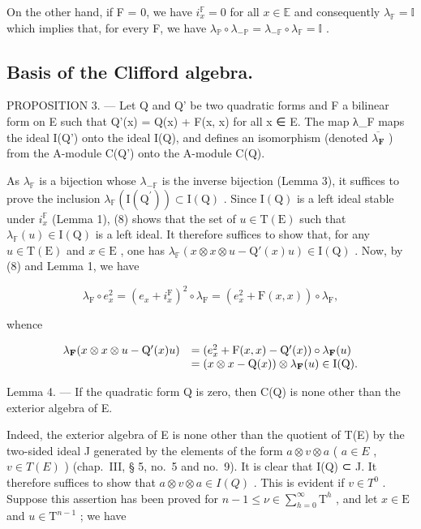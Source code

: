 On the other hand, if F = 0, we have \(i_x^{\mathbb{F}} = 0\) for all \(x \in \mathbb{E}\) and consequently \(\lambda_{\mathbb{F}} = \mathbb{I}\) which implies that, for every F, we have \(\lambda_{\mathbb{P}} \circ \lambda_{-\mathbb{P}} = \lambda_{-\mathbb{F}} \circ \lambda_{\mathbb{F}} = \mathbb{I}\) .

\subsection{Basis of the Clifford algebra.}

PROPOSITION 3. --- Let Q and Q' be two quadratic forms and F a bilinear form on E such that Q'(x) = Q(x) + F(x, x) for all x ∈ E. The map λ\_F maps the ideal I(Q') onto the ideal I(Q), and defines an isomorphism (denoted \(\overline{\lambda_{\mathbf{F}}}\) ) from the A-module C(Q') onto the A-module C(Q).

As \(\lambda_{\mathbb{F}}\) is a bijection whose \(\lambda_{-\mathbb{F}}\) is the inverse bijection (Lemma 3), it suffices to prove the inclusion \(\lambda_{\mathbb{F}}(\mathrm{I}(\mathrm{Q}^{\prime})) \subset \mathrm{I}(\mathrm{Q})\) . Since \(\mathrm{I}(\mathrm{Q})\) is a left ideal stable under \(i_x^{\mathbb{F}}\) (Lemma 1), (8) shows that the set of \(u \in \mathrm{T}(\mathrm{E})\) such that \(\lambda_{\mathbb{F}}(u) \in \mathrm{I}(\mathrm{Q})\) is a left ideal. It therefore suffices to show that, for any \(u \in \mathrm{T}(\mathrm{E})\) and \(x \in \mathrm{E}\) , one has \(\lambda_{\mathbb{F}}(x \otimes x \otimes u - \mathrm{Q}'(x)u) \in \mathrm{I}(\mathrm{Q})\) . Now, by (8) and Lemma 1, we have

\[
\lambda_ {\mathrm{F}} \circ e _ {x} ^ {2} = (e _ {x} + i _ {x} ^ {\mathrm{F}}) ^ {2} \circ \lambda_ {\mathrm{F}} = (e _ {x} ^ {2} + \mathrm{F} (x, x)) \circ \lambda_ {\mathrm{F}},
\]

whence

\[
\begin{array}{r l} \lambda_ {\mathbf {F}} (x \otimes x \otimes u - \mathrm{Q} ^ {\prime} (x) u) & = (e _ {x} ^ {2} + \mathrm{F} (x, x) - \mathrm{Q} ^ {\prime} (x)) \circ \lambda_ {\mathbf {F}} (u) \\ & = (x \otimes x - \mathrm{Q} (x)) \otimes \lambda_ {\mathbf {F}} (u) \in \mathrm{I} (\mathrm{Q}). \end{array}
\]

Lemma 4. — If the quadratic form Q is zero, then C(Q) is none other than the exterior algebra of E.

Indeed, the exterior algebra of E is none other than the quotient of T(E) by the two-sided ideal J generated by the elements of the form \(a \otimes v \otimes a\) ( \(a \in E\) , \(v \in T(E)\) ) (chap.~III, § 5, no.~5 and no.~9). It is clear that I(Q) ⊂ J. It therefore suffices to show that \(a \otimes v \otimes a \in I(Q)\) . This is evident if \(v \in T^0\) . Suppose this assertion has been proved for \(n-1 \leqslant \nu \in \sum_{h=0}^{\infty} \mathrm{T}^{h}\) , and let \(x \in \mathrm{E}\) and \(u \in \mathrm{T}^{n-1}\) ; we have

